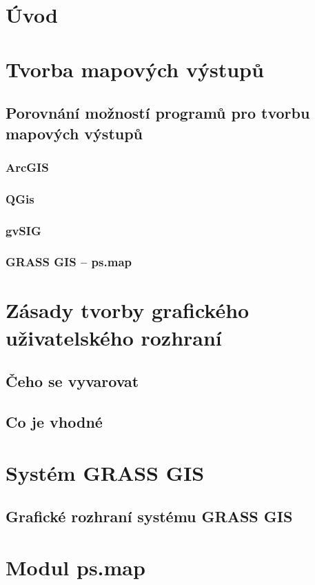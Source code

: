 \documentclass[a4paper,12pt,draft]{article}
\author{Anna Kratochvílová}
\begin{document}
\section{Úvod}
\section{Tvorba mapových výstupů}

\subsection{Porovnání možností programů pro tvorbu mapových výstupů}
\subsubsection{ArcGIS}
\subsubsection{QGis}
\subsubsection{gvSIG}
\subsubsection{GRASS GIS -- ps.map}
\label{sec:porovnani:psmap}

\section{Zásady tvorby grafického uživatelského rozhraní}
\subsection{Čeho se vyvarovat}
\subsection{Co je vhodné}


\section{Systém GRASS GIS}

\subsection{Grafické rozhraní systému GRASS GIS}

\section{Modul ps.map}
\end{document}

